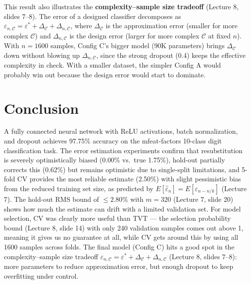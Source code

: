 \documentclass[11pt]{article}
\begin{document}
This result also illustrates the \textbf{complexity--sample size tradeoff} (Lecture 8, slides 7--8). The error of a designed classifier decomposes as $\varepsilon_{n,\mathcal{C}} = \varepsilon^* + \Delta_{\mathcal{C}} + \Delta_{n,\mathcal{C}}$, where $\Delta_{\mathcal{C}}$ is the approximation error (smaller for more complex $\mathcal{C}$) and $\Delta_{n,\mathcal{C}}$ is the design error (larger for more complex $\mathcal{C}$ at fixed $n$). With $n = 1600$ samples, Config C's bigger model (90K parameters) brings $\Delta_{\mathcal{C}}$ down without blowing up $\Delta_{n,\mathcal{C}}$, since the strong dropout (0.4) keeps the effective complexity in check. With a smaller dataset, the simpler Config A would probably win out because the design error would start to dominate.

\section{Conclusion}
A fully connected neural network with ReLU activations, batch normalization, and dropout achieves 97.75\% accuracy on the mfeat-factors 10-class digit classification task. The error estimation experiments confirm that resubstitution is severely optimistically biased (0.00\% vs.\ true 1.75\%), hold-out partially corrects this (0.62\%) but remains optimistic due to single-split limitations, and 5-fold CV provides the most reliable estimate (2.50\%) with slight pessimistic bias from the reduced training set size, as predicted by $E[\hat{\varepsilon}_n] = E[\varepsilon_{n-n/k}]$ (Lecture 7). The hold-out RMS bound of $\leq 2.80\%$ with $m=320$ (Lecture 7, slide 20) shows how much the estimate can drift with a limited validation set. For model selection, CV was clearly more useful than TVT --- the selection probability bound (Lecture 8, slide 14) with only 240 validation samples comes out above 1, meaning it gives us no guarantee at all, while CV gets around this by using all 1600 samples across folds. The final model (Config C) hits a good spot in the complexity--sample size tradeoff $\varepsilon_{n,\mathcal{C}} = \varepsilon^* + \Delta_{\mathcal{C}} + \Delta_{n,\mathcal{C}}$ (Lecture 8, slides 7--8): more parameters to reduce approximation error, but enough dropout to keep overfitting under control.
\end{document}
